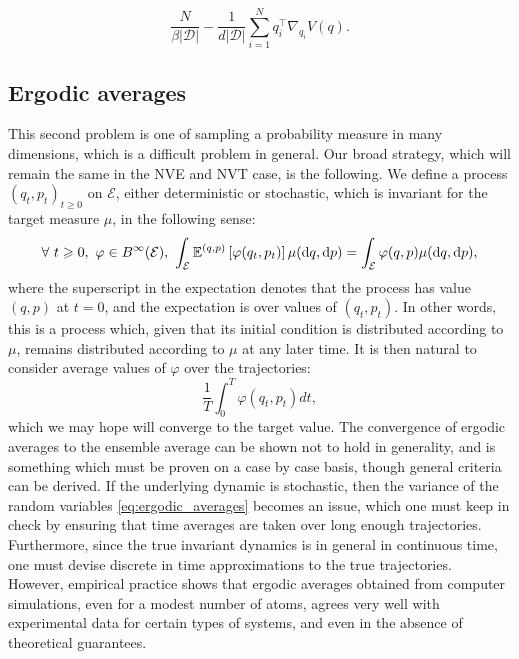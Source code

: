 $$\frac{N}{\beta |\mathcal D|}- \frac{1}{d|\mathcal D|}\sum_{i=1}^N q_i^\intercal\nabla_{q_i}V(q).$$

\subsection{Ergodic averages}
This second problem is one of sampling a probability measure in many dimensions, which is a difficult problem in general. Our broad strategy, which will remain the same in the NVE and NVT case, is the following.
We define a process $(q_t,p_t)_{t\geq 0}$ on $\mathcal E$, either deterministic or stochastic, which is invariant for the target measure $\mu$, in the following sense: 
\begin{equation}
    \label{eq:invariant_measure}
    \forall \ t\geq 0,\ \varphi \in B^\infty(\mathcal E),\ \int_{\mathcal E}\E^{(q,p)}\left[ \varphi(q_t,p_t)\right]\mu(\mathrm{d}q,\mathrm{d}p)=\int_{\mathcal E}\varphi(q,p)\mu(\mathrm{d}q,\mathrm{d}p),
\end{equation}
where the superscript in the expectation denotes that the process has value $(q,p)$ at $t=0$, and the expectation is over values of $(q_t,p_t)$. In other words, this is a process which, given that its initial condition is distributed according to $\mu$, remains distributed according to $\mu$ at any later time. It is then natural to consider average values of $\varphi$ over the trajectories:
\begin{equation}
\label{eq:ergodic_averages}
 \frac{1}{T}\int_{0}^T \varphi(q_t,p_t)dt,
\end{equation}
which we may hope will converge to the target value. The convergence of ergodic averages to the ensemble average can be shown not to hold in generality, and is something which must be proven on a case by case basis, though general criteria can be derived.
If the underlying dynamic is stochastic, then the variance of the random variables \eqref{eq:ergodic_averages} becomes an issue, which one must keep in check by ensuring that time averages are taken over long enough trajectories. 
Furthermore, since the true invariant dynamics is in general in continuous time, one must devise discrete in time approximations to the true trajectories.
However, empirical practice shows that ergodic averages obtained from computer simulations, even for a modest number of atoms, agrees very well with experimental data for certain types of systems, and even in the absence of theoretical guarantees.

